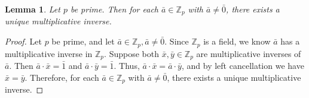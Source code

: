 \documentclass[12pt, titlepage]{amsart}
\newcommand\Z{{\mathbb Z}}
\newtheorem{lemma}{Lemma}[subsection]
\theoremstyle{definition}
\begin{document}
	\begin{lemma}\label{lemma:unique_inverses_in_Zp}
		Let $p$ be prime. Then for each $\bar{a} \in \Z_p$ with $\bar{a} \neq \bar{0}$, there exists a unique multiplicative inverse.
	\end{lemma}
	
	\begin{proof}
		Let $p$ be prime, and let $\bar{a} \in \Z_p, \bar{a} \neq \bar{0}$. 
		Since $\Z_p$ is a field, we know $\bar{a}$ has a multiplicative inverse in $\Z_p$.
		Suppose both $\bar{x}, \bar{y} \in \Z_p$ are multiplicative inverses of $\bar{a}$.
		Then $\bar{a} \cdot \bar{x} = \bar{1}$ and $\bar{a} \cdot \bar{y} = \bar{1}$.
		Thus, $\bar{a} \cdot \bar{x} = \bar{a} \cdot \bar{y}$, and by left cancellation we have $\bar{x}=\bar{y}$.
		Therefore, for each $\bar{a} \in \Z_p$ with $\bar{a} \neq \bar{0}$, there exists a unique multiplicative inverse.		
	\end{proof}
\end{document}
